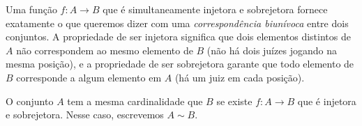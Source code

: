 Uma função $f \colon A \to B$ que é simultaneamente injetora e sobrejetora fornece exatamente o que queremos dizer com uma \textit{correspondência biunívoca} entre dois conjuntos. A propriedade de ser injetora significa que dois elementos distintos de $A$ não correspondem ao mesmo elemento de $B$ (não há dois juízes jogando na mesma posição), e a propriedade de ser sobrejetora garante que todo elemento de $B$ corresponde a algum elemento em $A$ (há um juiz em cada posição). 

\begin{definition}\label{def:mesma-cardinalidade}
O conjunto $A$ tem a mesma cardinalidade que $B$ se existe $f \colon A \to B$ que é injetora e sobrejetora. 
Nesse caso, escrevemos $A \sim B$.
\end{definition}

\bigskip 

